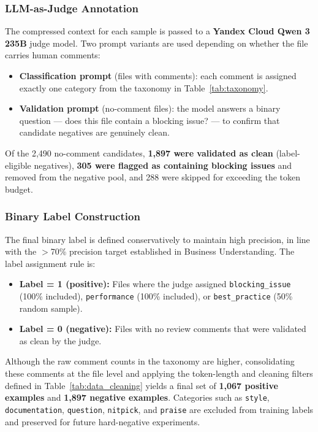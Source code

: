 \documentclass[11pt]{article}
\begin{document}
\subsubsection*{LLM-as-Judge Annotation}

The compressed context for each sample is passed to a \textbf{Yandex Cloud Qwen 3 235B} judge model. Two prompt variants are used depending on whether the file carries human comments:

\begin{itemize}
    \item \textbf{Classification prompt} (files with comments): each comment is assigned exactly one category from the taxonomy in Table~\ref{tab:taxonomy}.
    \item \textbf{Validation prompt} (no-comment files): the model answers a binary question — does this file contain a blocking issue? — to confirm that candidate negatives are genuinely clean.
\end{itemize}

Of the 2,490 no-comment candidates, \textbf{1,897 were validated as clean} (label-eligible negatives), \textbf{305 were flagged as containing blocking issues} and removed from the negative pool, and 288 were skipped for exceeding the token budget.

\subsubsection*{Binary Label Construction}

The final binary label is defined conservatively to maintain high precision, in line with the $>$70\% precision target established in Business Understanding. The label assignment rule is:

\begin{itemize}
    \item \textbf{Label = 1 (positive):} Files where the judge assigned \texttt{blocking\_issue} (100\% included), \texttt{performance} (100\% included), or \texttt{best\_practice} (50\% random sample).
    \item \textbf{Label = 0 (negative):} Files with no review comments that were validated as clean by the judge.
\end{itemize}

Although the raw comment counts in the taxonomy are higher, consolidating these comments at the file level and applying the token-length and cleaning filters defined in Table~\ref{tab:data_cleaning} yields a final set of \textbf{1,067 positive examples} and \textbf{1,897 negative examples}. Categories such as \texttt{style}, \texttt{documentation}, \texttt{question}, \texttt{nitpick}, and \texttt{praise} are excluded from training labels and preserved for future hard-negative experiments.
\end{document}
